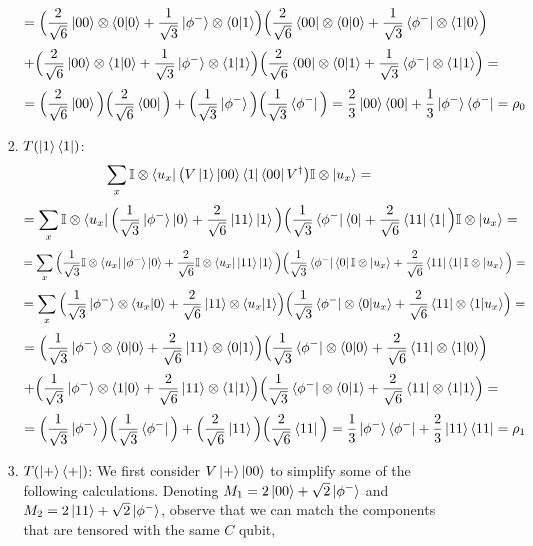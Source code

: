 \documentclass[12pt]{article}
\begin{document}
\begin{enumerate}
\begin{enumerate}
\begin{enumerate}
$$= 
\Big(
\frac{2}{\sqrt{6}} \ket{00}\otimes\langle 0 \vert 0\rangle + \frac{1}{\sqrt{3}} \ket{\phi^-}\otimes \langle 0 \vert 1\rangle\Big)
\Big(
\frac{2}{\sqrt{6}} \bra{00}\otimes \langle 0 \vert 0\rangle + \frac{1}{\sqrt{3}} \bra{\phi^-}\otimes \langle 1 \vert 0\rangle\Big) $$ 
$$ + 
\Big(
\frac{2}{\sqrt{6}} \ket{00}\otimes\langle 1 \vert 0\rangle + \frac{1}{\sqrt{3}} \ket{\phi^-}\otimes \langle 1 \vert 1\rangle\Big)
\Big(
\frac{2}{\sqrt{6}} \bra{00}\otimes \langle 0 \vert 1\rangle + \frac{1}{\sqrt{3}} \bra{\phi^-}\otimes \langle 1 \vert 1\rangle\Big)= $$
$$= 
\Big(
\frac{2}{\sqrt{6}} \ket{00} \Big)
\Big(
\frac{2}{\sqrt{6}} \bra{00} \Big) + 
\Big(
\frac{1}{\sqrt{3}} \ket{\phi^-}\Big)
\Big(
\frac{1}{\sqrt{3}} \bra{\phi^-}\Big)= \frac{2}{3} \ket{00}\bra{00} + \frac{1}{3} \ket{\phi^-}\bra{\phi^-} = \rho_0 $$

    \item $T(\ket{1}\bra{1})$:
$$ 
\sum_x \mathbb{I}\otimes \bra{u_x} \big(V \ket{1}\ket{00}\bra{1}\bra{00} V^\dagger \big)\mathbb{I}\otimes \ket{u_x} = $$
$$ = \sum_x \mathbb{I}\otimes \bra{u_x} 
\Big(
\frac{1}{\sqrt{3}} \ket{\phi^-}\ket{0} + \frac{2}{\sqrt{6}} \ket{11}\ket{1}\Big)
\Big(
\frac{1}{\sqrt{3}} \bra{\phi^-}\bra{0} + \frac{2}{\sqrt{6}} \bra{11}\bra{1}\Big)
\mathbb{I}\otimes \ket{u_x} =
$$
$$= \sum_x 
\Big(
\frac{1}{\sqrt{3}} \mathbb{I}\otimes \bra{u_x} \ket{\phi^-}\ket{0} + \frac{2}{\sqrt{6}} \mathbb{I}\otimes \bra{u_x} \ket{11}\ket{1}\Big)
\Big(
\frac{1}{\sqrt{3}} \bra{\phi^-}\bra{0} \mathbb{I}\otimes \ket{u_x} + \frac{2}{\sqrt{6}} \bra{11}\bra{1} \mathbb{I}\otimes \ket{u_x}\Big)
 =
$$
$$= \sum_x 
\Big(
\frac{1}{\sqrt{3}} \ket{\phi^-}\otimes\langle u_x \vert 0\rangle + \frac{2}{\sqrt{6}} \ket{11}\otimes \langle u_x \vert 1\rangle\Big)
\Big(
\frac{1}{\sqrt{3}} \bra{\phi^-}\otimes \langle 0 \vert u_x\rangle + \frac{2}{\sqrt{6}} \bra{11}\otimes \langle 1 \vert u_x\rangle\Big) = $$
$$= 
\Big(
\frac{1}{\sqrt{3}} \ket{\phi^-}\otimes\langle 0 \vert 0\rangle + \frac{2}{\sqrt{6}} \ket{11}\otimes \langle 0 \vert 1\rangle\Big)
\Big(
\frac{1}{\sqrt{3}} \bra{\phi^-}\otimes \langle 0 \vert 0\rangle + \frac{2}{\sqrt{6}} \bra{11}\otimes \langle 1 \vert 0\rangle\Big) $$ 
$$ + 
\Big(
\frac{1}{\sqrt{3}} \ket{\phi^-}\otimes\langle 1 \vert 0\rangle + \frac{2}{\sqrt{6}} \ket{11}\otimes \langle 1 \vert 1\rangle\Big)
\Big(
\frac{1}{\sqrt{3}} \bra{\phi^-}\otimes \langle 0 \vert 1\rangle + \frac{2}{\sqrt{6}} \bra{11}\otimes \langle 1 \vert 1\rangle\Big)= $$
$$= 
\Big(
\frac{1}{\sqrt{3}} \ket{\phi^-} \Big)
\Big(
\frac{1}{\sqrt{3}} \bra{\phi^-} \Big) + 
\Big(
\frac{2}{\sqrt{6}} \ket{11}\Big)
\Big(
\frac{2}{\sqrt{6}} \bra{11}\Big)= \frac{1}{3} \ket{\phi^-}\bra{\phi^-} + \frac{2}{3} \ket{11}\bra{11} = \rho_1 $$
    \item $T(\ket{+}\bra{+})$:
We first consider $V\ket{+}\ket{00}$ to simplify some of the following calculations. Denoting $M_1 = 2\ket{00} + \sqrt{2} \ket{\phi^-}$ and $M_2 = 2\ket{11} + \sqrt{2} \ket{\phi^-}$, observe that we can match the components that are tensored with the same $C$ qubit,

\end{enumerate}
\end{enumerate}
\end{enumerate}
\end{document}
